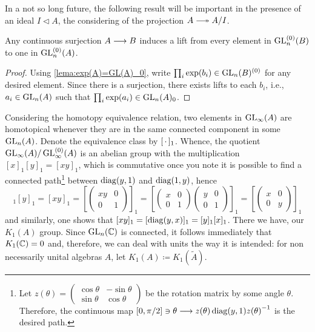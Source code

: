 In a not so long future, the following result will be important in the presence of an ideal $I\triangleleft A$, the considering of the projection $A \longtwoheadrightarrow A/I$.
\begin{corolario}
    \label{corol:lift by surjection}
    Any continuous surjection $A \longrightarrow B$ induces a lift from every element in $\operatorname{GL}_n^{(0)}(B)$ to one in $\operatorname{GL}_n^{(0)}(A)$.
    \begin{proof}
        Using \ref*{lema:exp(A)=GL(A)_0}, write $\prod_i \exp(b_i) \in \operatorname{GL}_n(B)^{(0)}$ for any desired element. Since there is a surjection, there exists lifts to each $b_i$, i.e., $a_i \in \operatorname{GL}_n(A)$ such that $\prod_i \exp(a_i) \in \operatorname{GL}_n(A)_{0}$.
    \end{proof}
\end{corolario}

Considering the homotopy equivalence relation, two elements in $\operatorname{GL}_\infty(A)$ are homotopical whenever they are in the same connected component in some $\operatorname{GL}_n(A)$. Denote the equivalence class by $[\operatorname{\,\cdot\,}]_1$. Whence, the quotient $\operatorname{GL}_\infty(A)/\operatorname{GL}_\infty^{(0)}(A)$ is an abelian group with the multiplication $[x]_1[y]_1 = [xy]_1$, which is commutative once you note it is possible to find a connected path\footnote{
        Let $z(\theta) = \left(\begin{smallmatrix}
            \cos \theta & -\sin \theta \\ \sin \theta & \cos \theta
        \end{smallmatrix}\right)$ be the rotation matrix by some angle $\theta$. Therefore, the continuous map $[0,\pi/2] \ni \theta \longrightarrow z(\theta) \operatorname{diag}(y,1) {z(\theta)}^{-1}$ is the desired path.
    } between $\operatorname{diag}(y,1)$ and $\operatorname{diag}(1,y)$, hence 
    \begin{equation*}
        [x]_1[y]_1 = [xy]_1 = \left[\begin{pmatrix}
            xy & 0 \\ 0 & 1
        \end{pmatrix}\right]_1= \left[\begin{pmatrix}
            x & 0 \\ 0 & 1
        \end{pmatrix}\begin{pmatrix}
            y & 0 \\ 0 & 1
        \end{pmatrix}\right]_1 = \left[\begin{pmatrix}
            x & 0 \\ 0 & y
        \end{pmatrix}\right]_1 
    \end{equation*}    
    and similarly, one shows that $[xy]_1 = [\operatorname{diag}(y,x)]_1 = [y]_1[x]_1$. There we have, our $K_1(A)$ group. Since $\operatorname{GL}_n(\operatorname{\mathbb{C}})$ is connected, it follows immediately that $K_1(\operatorname{\mathbb{C}}) = 0$ and, therefore, we can deal with units the way it is intended: for non necessarily unital algebras $A$, let $K_1(A) \coloneqq K_1(\widetilde{A})$.


